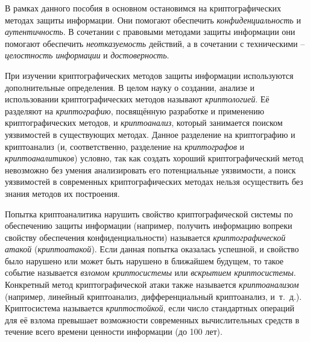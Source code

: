 В рамках данного пособия в основном остановимся на криптографических методах защиты информации. Они помогают обеспечить \emph{конфиденциальность} и \emph{аутентичность}. В сочетании с правовыми методами защиты информации они помогают обеспечить \emph{неотказуемость} действий, а в сочетании с техническими -- \emph{целостность информации} и \emph{достоверность}.

При изучении криптографических методов защиты информации используются дополнительные определения. В целом науку о создании, анализе и использовании криптографических методов называют \emph{криптологией}. Её разделяют на \emph{криптографию}, посвящённую разработке и применению криптографических методов, и \emph{криптоанализ}, который занимается поиском уязвимостей в существующих методах. Данное разделение на криптографию и криптоанализ (и, соответственно, разделение на \emph{криптографов} и \emph{криптоаналитиков}) условно, так как создать хороший криптографический метод невозможно без умения анализировать его потенциальные уязвимости, а поиск уязвимостей в современных криптографических методах нельзя осуществить без знания методов их построения.

Попытка криптоаналитика нарушить свойство криптографической системы по обеспечению защиты информации (например, получить информацию вопреки свойству обеспечения конфиденциальности) называется \emph{криптографической атакой} (\emph{криптоатакой}). Если данная попытка оказалась успешной, и свойство было нарушено или может быть нарушено в ближайшем будущем, то такое событие называется \emph{взломом криптосистемы} или \emph{вскрытием криптосистемы}. Конкретный метод криптографической атаки также называется \emph{криптоанализом} (например, линейный криптоанализ, дифференциальный криптоанализ, и~т.~д.). Криптосистема называется \emph{криптостойкой}, если число стандартных операций для её взлома превышает возможности современных вычислительных средств в течение всего времени ценности информации (до 100 лет).

